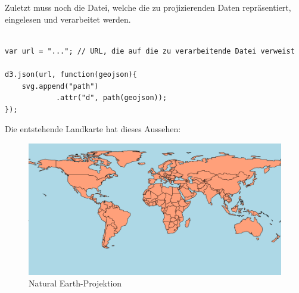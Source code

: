 Zuletzt muss noch die Datei, welche die zu projizierenden Daten repräsentiert, eingelesen und verarbeitet werden.

\begin{lstlisting}

var url = "..."; // URL, die auf die zu verarbeitende Datei verweist

d3.json(url, function(geojson){
    svg.append("path")
            .attr("d", path(geojson));
});

\end{lstlisting}

Die entstehende Landkarte hat dieses Aussehen:

\begin{figure}[H]
    \centering
    
    \includegraphics[width=.5\textwidth]{images/mapSinglePath}
    \caption{\glqq Natural Earth\grqq -Projektion}
\end{figure}